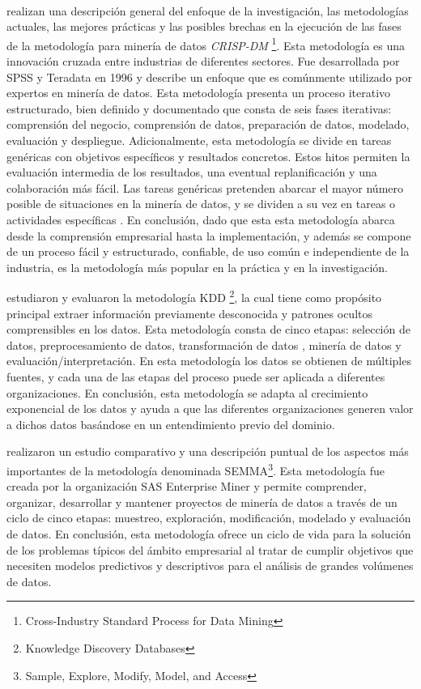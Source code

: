 \\
\cite{Schroer2021} realizan una descripción general del enfoque de la investigación, las metodologías actuales, las mejores prácticas y las posibles brechas en la ejecución de las fases de la metodología para minería de datos \textit{CRISP-DM} \footnote{Cross-Industry Standard Process for Data Mining }. Esta metodología es una innovación cruzada entre industrias de diferentes sectores. Fue desarrollada por SPSS y Teradata en 1996 y describe un enfoque que es comúnmente utilizado por expertos en minería de datos. Esta metodología presenta un proceso iterativo estructurado, bien definido y documentado que consta de seis fases iterativas: comprensión del negocio, comprensión de datos, preparación de datos, modelado, evaluación y despliegue. Adicionalmente, esta metodología se divide en tareas genéricas con objetivos específicos y resultados concretos. Estos hitos permiten la evaluación intermedia de los resultados, una eventual replanificación y una colaboración más fácil. Las tareas genéricas pretenden abarcar el mayor número posible de situaciones en la minería de datos, y se dividen a su vez en tareas o actividades específicas \cite{Mladenic2012}. En conclusión, dado que esta esta metodología abarca desde la comprensión empresarial hasta la implementación, y además se compone de un proceso fácil y estructurado, confiable, de uso común e independiente de la industria, es la metodología más popular en la práctica y en la investigación.

\cite{Safhi2019} estudiaron y evaluaron la metodología KDD \footnote{Knowledge Discovery Databases}, la cual tiene como propósito principal extraer información previamente desconocida y patrones ocultos comprensibles en los datos. Esta metodología consta de cinco etapas: selección de datos,  preprocesamiento de datos, transformación de datos , minería de datos y evaluación/interpretación. En esta metodología los datos se obtienen de múltiples fuentes, y cada una de las etapas del proceso puede ser aplicada a diferentes organizaciones. En conclusión, esta metodología se adapta al crecimiento exponencial de los datos y ayuda a que las diferentes organizaciones generen valor a dichos datos basándose en un entendimiento previo del dominio.

\cite{Shafique2014} realizaron un estudio comparativo y una descripción puntual de los aspectos más importantes de la metodología denominada SEMMA\footnote{Sample, Explore, Modify, Model, and Access}. Esta metodología fue creada por la organización SAS Enterprise Miner y permite comprender, organizar, desarrollar y mantener proyectos de minería de datos a través de un ciclo de cinco etapas: muestreo, exploración, modificación, modelado y evaluación de datos.  En conclusión, esta metodología ofrece un ciclo de vida para la solución de los problemas típicos del ámbito empresarial al tratar de cumplir objetivos que necesiten modelos predictivos y descriptivos para el análisis de grandes volúmenes de datos.

